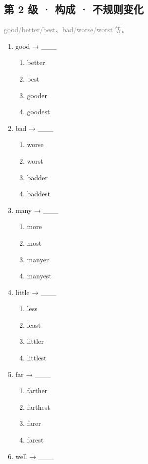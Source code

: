 \documentclass[11pt,a4paper]{ctexart}
\begin{document}
\subsection*{第 2 级 · 构成 · 不规则变化}
\noindent\textcolor{gray}{good/better/best、bad/worse/worst 等。}\par\smallskip
\begin{enumerate}[leftmargin=*,itemsep=4pt]
\item good → \_\_\_
\begin{enumerate}[label=\Alph*.,leftmargin=2em,itemsep=1pt,topsep=2pt]
\item better
\item best
\item gooder
\item goodest
\end{enumerate}
\item bad → \_\_\_
\begin{enumerate}[label=\Alph*.,leftmargin=2em,itemsep=1pt,topsep=2pt]
\item worse
\item worst
\item badder
\item baddest
\end{enumerate}
\item many → \_\_\_
\begin{enumerate}[label=\Alph*.,leftmargin=2em,itemsep=1pt,topsep=2pt]
\item more
\item most
\item manyer
\item manyest
\end{enumerate}
\item little → \_\_\_
\begin{enumerate}[label=\Alph*.,leftmargin=2em,itemsep=1pt,topsep=2pt]
\item less
\item least
\item littler
\item littlest
\end{enumerate}
\item far → \_\_\_
\begin{enumerate}[label=\Alph*.,leftmargin=2em,itemsep=1pt,topsep=2pt]
\item farther
\item farthest
\item farer
\item farest
\end{enumerate}
\item well → \_\_\_

\end{enumerate}
\end{document}

